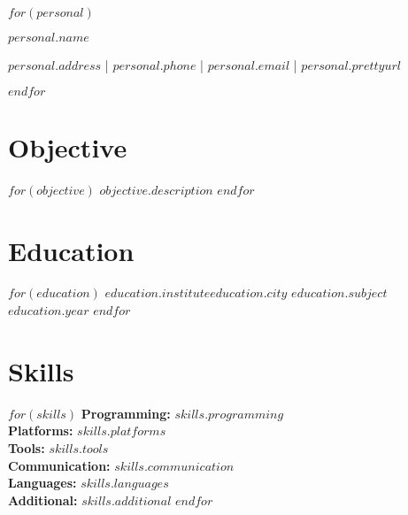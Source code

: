 \documentclass[10pt, a4paper]{article}
\begin{document}
$for(personal)$
    \noindent
    \begin{centering} \Huge{$personal.name$} \\
    \end{centering}

    \vspace{.1cm}

    \begin{centering}
      \small
        {$personal.address$} |
        {$personal.phone$}   |
        {$personal.email$}   |
        {\href{$personal.website$}{$personal.prettyurl$}} \\
    \end{centering}
$endfor$


\vspace{-.5cm}

\section*{Objective}
$for(objective)$
  {$objective.description$}
$endfor$

\vspace{-.3cm} %

\section*{Education}
  \resumeSubHeadingListStart
    $for(education)$
      \resumeSubheading
        {$education.institute$}{$education.city$}
        {$education.subject$}{$education.year$} 
    $endfor$
  \resumeSubHeadingListEnd

\vspace{-.3cm} %

\section*{Skills}
  $for(skills)$ %
      \textbf{Programming:} {$skills.programming$} \\
      \textbf{Platforms:} {$skills.platforms$} \\
      \textbf{Tools:} {$skills.tools$} \\
      \textbf{Communication:} {$skills.communication$} \\
      \textbf{Languages:} {$skills.languages$} \\
      \textbf{Additional:} {$skills.additional$}
  $endfor$
\end{document}
